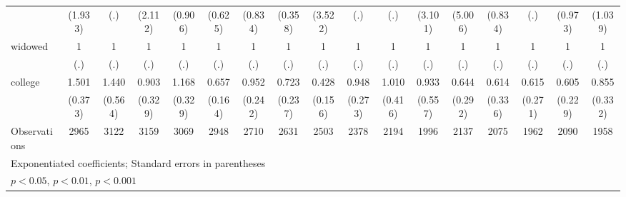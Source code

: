 {\begin{tabular}{l*{16}{c}}
                    &     (1.933)         &         (.)         &     (2.112)         &     (0.906)         &     (0.625)         &     (0.834)         &     (0.358)         &     (3.522)         &         (.)         &         (.)         &     (3.101)         &     (5.006)         &     (0.834)         &         (.)         &     (0.973)         &     (1.039)         \\
[1em]
widowed             &           1         &           1         &           1         &           1         &           1         &           1         &           1         &           1         &           1         &           1         &           1         &           1         &           1         &           1         &           1         &           1         \\
                    &         (.)         &         (.)         &         (.)         &         (.)         &         (.)         &         (.)         &         (.)         &         (.)         &         (.)         &         (.)         &         (.)         &         (.)         &         (.)         &         (.)         &         (.)         &         (.)         \\
[1em]
college             &       1.501         &       1.440         &       0.903         &       1.168         &       0.657         &       0.952         &       0.723         &       0.428\sym{*}  &       0.948         &       1.010         &       0.933         &       0.644         &       0.614         &       0.615         &       0.605         &       0.855         \\
                    &     (0.373)         &     (0.564)         &     (0.329)         &     (0.329)         &     (0.164)         &     (0.242)         &     (0.237)         &     (0.156)         &     (0.273)         &     (0.416)         &     (0.557)         &     (0.292)         &     (0.336)         &     (0.271)         &     (0.229)         &     (0.332)         \\
\hline
Observations        &        2965         &        3122         &        3159         &        3069         &        2948         &        2710         &        2631         &        2503         &        2378         &        2194         &        1996         &        2137         &        2075         &        1962         &        2090         &        1958         \\
\hline\hline
\multicolumn{17}{l}{\footnotesize Exponentiated coefficients; Standard errors in parentheses}\\
\multicolumn{17}{l}{\footnotesize \sym{*} \(p<0.05\), \sym{**} \(p<0.01\), \sym{***} \(p<0.001\)}\\
\end{tabular}
}
